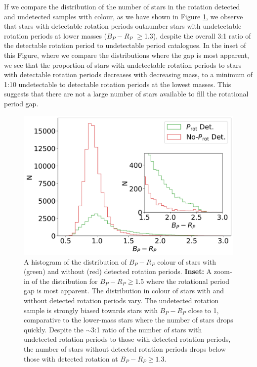 If we compare the distribution of the number of stars in the rotation detected and undetected samples with colour, as we have shown in Figure \ref{fig:n_det_nondet}, we observe that stars with detectable rotation periods outnumber stars with undetectable rotation periods at lower masses ($B_P-R_P$ $\geq$1.3), despite the overall 3:1 ratio of the detectable rotation period to undetectable period catalogues.
In the inset of this Figure, where we compare the distributions where the gap is most apparent, we see that the proportion of stars with undetectable rotation periods to stars with detectable rotation periods decreases with decreasing mass, to a minimum of 1:10 undetectable to detectable rotation periods at the lowest masses.
This suggests that there are not a large number of stars available to fill the rotational period gap.

\begin{figure}
\centering
  \includegraphics[width=\textwidth]{Figures/rot_gap_figures/hist_obs.png}
  \caption[A histogram of the distribution of $B_P-R_P$ colour of stars with (green) and without (red) detected rotation periods.]{A histogram of the distribution of $B_P-R_P$ colour of stars with (green) and without (red) detected rotation periods. \textbf{Inset:} A zoom-in of the distribution for $B_P-R_P\geq1.5$ where the rotational period gap is most apparent. The distribution in colour of stars with and without detected rotation periods vary. The undetected rotation sample is strongly biased towards stars with $B_P-R_P$ close to 1, comparative to the lower-mass stars where the number of stars drops quickly. Despite the $\sim$3:1 ratio of the number of stars with undetected rotation periods to those with detected rotation periods, the number of stars without detected rotation periods drops below those with detected rotation at $B_P-R_P\geq1.3$.
  	}
  \label{fig:n_det_nondet}
\end{figure}

